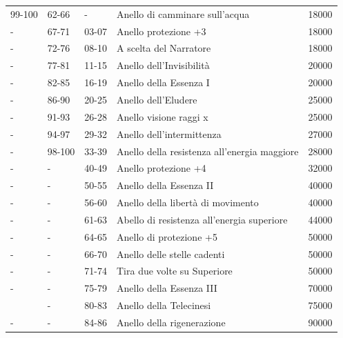 \documentclass[a4paper,11pt,twoside,openany]{book}
\begin{document}
\begin{tabular}{lllll}
	99-100           & 62-66              & - & Anello di camminare sull'acqua\index{nello di camminare sull'acqua}     & 18000\\
	-& 67-71              & 03-07             & Anello protezione +3    & 18000\\
	-& 72-76              & 08-10             & A scelta del Narratore  & 18000\\
	-& 77-81              & 11-15             & Anello dell'Invisibilità \index{nello dell'Invisibilita'}               & 20000\\
	-& 82-85              & 16-19             & Anello della Essenza I \index{Anello della Essenza}     & 20000\\
	-& 86-90              & 20-25             & Anello dell'Eludere \index{Anello dell'Eludere}         & 25000\\
	-& 91-93              & 26-28             & Anello visione raggi x\index{Anello visione raggi x}    & 25000\\
	-& 94-97              & 29-32             & Anello dell'intermittenza \index{Anello dell'intermittenza}             & 27000\\
	-& 98-100             & 33-39             & Anello della resistenza all'energia maggiore            & 28000\\
	-& -  & 40-49             & Anello protezione +4    & 32000\\
	-& -  & 50-55             & Anello della Essenza II & 40000\\
	-& -  & 56-60             & Anello della libertà di movimento \index{Anello della libertà di movimento}             & 40000\\
	-& -  & 61-63             & Abello di resistenza all'energia superiore              & 44000\\
	-& -  & 64-65             & Anello di protezione +5 & 50000\\
	-& -  & 66-70             & Anello delle stelle cadenti \index{nello delle stelle cadenti}          & 50000\\
	-& -  & 71-74             & Tira due volte su Superiore             & 50000\\
	-& -  & 75-79             & Anello della Essenza III& 70000\\
	 & -  & 80-83             & Anello della Telecinesi \index{Anello della Telecinesi} & 75000\\
	-& -  & 84-86             & Anello della rigenerazione \index{Anello della rigenerazione}           & 90000\\

\end{tabular}
\end{document}
